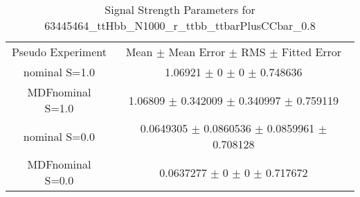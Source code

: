 \begin{table}
\centering
\caption{Signal Strength Parameters for 63445464\_ttHbb\_N1000\_r\_ttbb\_ttbarPlusCCbar\_0.8}
\begin{tabular}{cc}
\toprule
Pseudo Experiment & Mean $\pm$ Mean Error $\pm$ RMS $\pm$ Fitted Error\\
nominal S=1.0 & \num{1.06921} $\pm$ \num{0} $\pm$ \num{0} $\pm$ \num{0.748636}\\
MDFnominal S=1.0 & \num{1.06809} $\pm$ \num{0.342009} $\pm$ \num{0.340997} $\pm$ \num{0.759119}\\
nominal S=0.0 & \num{0.0649305} $\pm$ \num{0.0860536} $\pm$ \num{0.0859961} $\pm$ \num{0.708128}\\
MDFnominal S=0.0 & \num{0.0637277} $\pm$ \num{0} $\pm$ \num{0} $\pm$ \num{0.717672}\\
\bottomrule
\end{tabular}
\end{table}